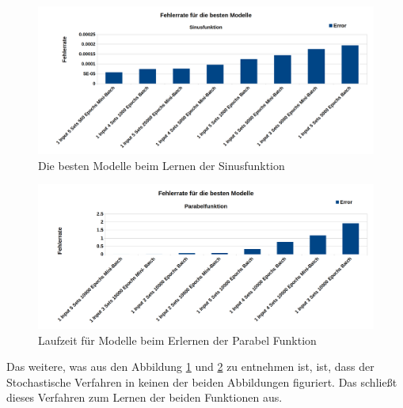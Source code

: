 {\begin{figure}[htbp]
	\centering
	\includegraphics[width=1\textwidth]{images/charts/SinusFunktionbesteModelle_bold.png}
	\caption{Die besten Modelle beim Lernen der Sinusfunktion}
	\label{best_sinus}
\end{figure}

\begin{figure}[htbp]
	\centering
	\includegraphics[width=1\textwidth]{images/charts/ParabelFunktionbesteModelle_bold.png}
	\caption{Laufzeit für Modelle beim Erlernen der Parabel Funktion}
	\label{best_parabola}
\end{figure}

Das weitere, was aus den Abbildung \ref{best_sinus} und \ref{best_parabola} zu entnehmen ist, ist, dass der Stochastische Verfahren in keinen der beiden Abbildungen figuriert. Das schließt dieses Verfahren zum Lernen der beiden Funktionen aus.

}
